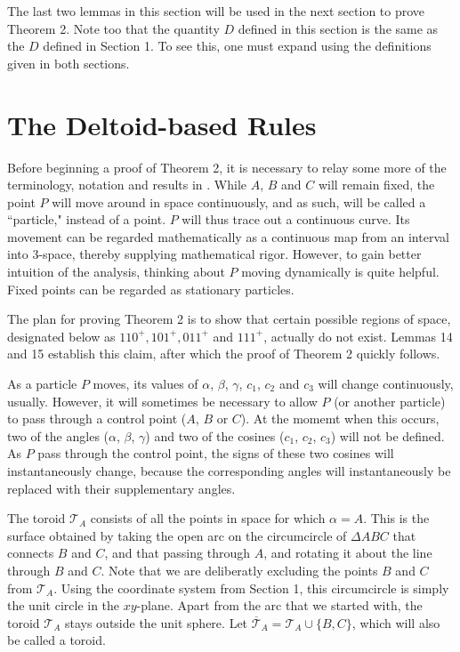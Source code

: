 \documentclass[a4paper, twoside]{article}
\begin{document}
The last two lemmas in this section will be used in the next section to prove Theorem 2. Note too that the quantity $D$ defined in this section is the same as the $D$ defined in Section 1. To see this, one must expand using the definitions given in both sections. 


\section{The Deltoid-based Rules}

Before beginning a proof of Theorem 2, it is necessary to relay some more of the terminology, notation and results in \cite{RW}. While $A$, $B$ and $C$ will remain fixed, the point $P$ will move around in space continuously, and as such, will be called a ``particle," instead of a point. $P$ will thus trace out a continuous curve. Its movement can be regarded mathematically as a continuous map from an interval into 3-space, thereby supplying mathematical rigor. However, to gain better intuition of the analysis, thinking about $P$ moving dynamically is quite helpful. Fixed points can be regarded as stationary particles. 

The plan for proving Theorem 2 is to show that certain possible regions of space, designated below as $110^+, 101^+, 011^+$ and $111^+$, actually do not exist. Lemmas 14 and 15 establish this claim, after which the proof of Theorem 2 quickly follows.

As a particle $P$ moves, its values of $\alpha$, $\beta$, $\gamma$, $c_1$, $c_2$ and $c_3$ will change continuously, usually. However, it will sometimes be necessary to allow $P$ (or another particle) to pass through a control point ($A$, $B$ or $C$). At the momemt when this occurs, two of the angles ($\alpha$, $\beta$, $\gamma$) and two of the cosines ($c_1$, $c_2$, $c_3$) will not be defined. As $P$ pass through the control point, the signs of these two cosines will instantaneously change, because the corresponding angles will instantaneously be replaced with their supplementary angles. 

The toroid $\mathcal{T}_A$ consists of all the points in space for which $\alpha = A$. This is the surface obtained by taking the open arc on the circumcircle of $\Delta ABC$ that connects $B$ and $C$, and that passing through $A$, and rotating it about the line through $B$ and $C$. Note that we are deliberatly excluding the points $B$ and $C$ from $\mathcal{T}_A$. Using the coordinate system from Section 1, this circumcircle is simply the unit circle in the $xy$-plane. Apart from the arc that we started with, the toroid $\mathcal{T}_A$ stays outside the unit sphere. Let $\overline{\mathcal{T}}_A = \mathcal{T}_A \cup \{B,C\}$, which will also be called a toroid.
\end{document}
